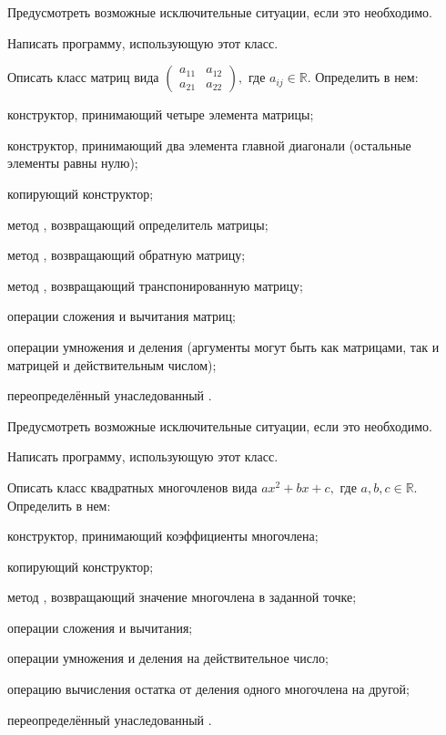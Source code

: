 Предусмотреть возможные исключительные ситуации, если это необходимо.

Написать программу, использующую этот класс.

\task Описать класс  матриц вида $\begin{pmatrix}
  a_{11} & a_{12} \\
  a_{21} & a_{22}
\end{pmatrix},$ где $a_{ij} \in \mathbb{R}$. Определить в нем:
\begin{itemize*}
\item конструктор, принимающий четыре элемента матрицы;
\item конструктор, принимающий два элемента главной диагонали
  (остальные элементы равны нулю);
\item копирующий конструктор;
\item метод , возвращающий определитель матрицы;
\item метод , возвращающий обратную матрицу;
\item метод , возвращающий транспонированную матрицу;
\item операции сложения и вычитания матриц;
\item операции умножения и деления (аргументы могут быть как матрицами,
  так и матрицей и действительным числом);
\item переопределённый унаследованный .
\end{itemize*}

Предусмотреть возможные исключительные ситуации, если это необходимо.

Написать программу, использующую этот класс.

\task Описать класс  квадратных многочленов вида
$ax^2+bx+c,$ где $a,b,c \in \mathbb{R}$. Определить в нем:
\begin{itemize*}
\item конструктор, принимающий коэффициенты многочлена;
\item копирующий конструктор;
\item метод , возвращающий значение многочлена в заданной
  точке;
\item операции сложения и вычитания;
\item операции умножения и деления на действительное число;
\item операцию вычисления остатка от деления одного многочлена на
  другой;
\item переопределённый унаследованный .
\end{itemize*}

